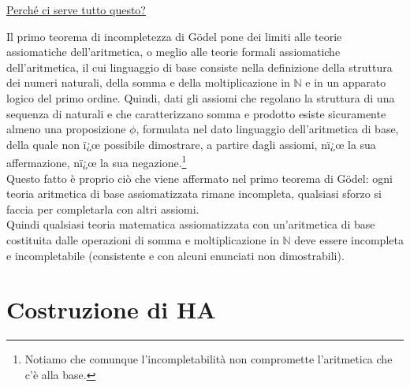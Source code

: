 \vspace{0.5 cm}

\underline{Perch\'e ci serve tutto questo?}\\
\vspace{0.2 cm}

Il primo teorema di incompletezza di G\"odel pone dei limiti alle teorie assiomatiche dell'aritmetica, o meglio alle teorie formali assiomatiche dell'aritmetica, il cui linguaggio di base consiste nella definizione della struttura dei numeri naturali, della somma e della moltiplicazione in $\mathbb{N}$ e in un apparato logico del primo ordine.\newline
Quindi, dati gli assiomi che regolano la struttura di una sequenza di naturali e che caratterizzano somma e prodotto esiste sicuramente almeno una proposizione $\phi$, formulata nel dato linguaggio dell'aritmetica di base, della quale non ï¿œ possibile dimostrare, a partire dagli assiomi, nï¿œ la sua affermazione, nï¿œ la sua negazione.\footnote{Notiamo che comunque l'incompletabilit\`a non compromette l'aritmetica che c'\`e alla base.}\\
Questo fatto \`e proprio ci\`o che viene affermato nel primo teorema di G\"odel: ogni teoria aritmetica di base assiomatizzata rimane incompleta, qualsiasi sforzo si faccia per completarla con altri assiomi.\\
Quindi qualsiasi teoria matematica assiomatizzata con un'aritmetica di base costituita dalle operazioni di somma e moltiplicazione in $\mathbb{N}$ deve essere incompleta e incompletabile (consistente e con alcuni enunciati non dimostrabili).

\section{Costruzione di HA}
